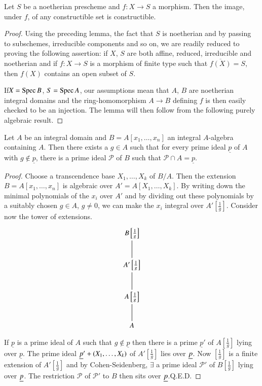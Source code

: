 \begin{lemma}\label{chap3-lem3.3.6}
Let $S$ be a noetherian prescheme and $f:X\to S$ a morphism. Then the
image, under $f$, of any constructible set is constructible.
\end{lemma}

\begin{proof}
Using the preceding lemma, the fact that $S$ is noetherian and by
passing to subschemes, irreducible components and so on, we are
readily reduced to proving the following assertion: if $X$, $S$ are
both affine, reduced, irreducible and noetherian and if $f:X\to S$ is
a morphism of finite type such that $\overline{f(X)}=S$, then $f(X)$
contains an open subset of $S$. 

If\pageoriginale $X=\operatorname{Spec} B$, $S=\operatorname{Spec} A$, our assumptions mean that
$A$, $B$ are noetherian integral domains and the ring-homomorphism
$A\to B$ defining $f$ is then easily checked to be an injection. The
lemma will then follow from the following purely algebraic result. 
\end{proof}

\begin{lemma}\label{chap3-lem3.3.7}
Let $A$ be an integral domain and $B=A[x_{1},\ldots,x_{n}]$ an
integral $A$-algebra containing $A$. Then there exists a $g\in A$ such
that for every prime ideal $\underline{p}$ of $A$ with $g\not\in
\underline{p}$, there is a prime ideal $\mathscr{P}$ of $B$ such that
$\mathscr{P}\cap A=\underline{p}$.
\end{lemma}

\begin{proof}
Choose a transcendence base $X_{1},\ldots,X_{k}$ of $B/A$. Then the
extension $B=A[x_{1},\ldots,x_{n}]$ is algebraic over
$A'=A[X_{1},\ldots,X_{k}]$. By writing down the minimal polynomials of
the $x_{i}$ over $A'$ and by dividing out these polynomials by a
suitably chosen $g\in A$, $g\neq 0$, we can make the $x_{i}$ integral
over $A'\left[\frac{1}{g}\right]$. Consider now the tower of
extensions.
\[
\xymatrix{
B\left[\frac{1}{g}\right]\ar@{-}[d]\\
A'\left[\frac{1}{g}\right]\ar@{-}[d]\\
A\left[\frac{1}{g}\right]\ar@{-}[d]\\
A
}
\]

If $\underline{p}$ is a prime ideal of $A$ such that $g\not\in
\underline{p}$ then there is a prime $\underline{p}'$ of
$A\left[\frac{1}{g}\right]$ lying over $\underline{p}$. The prime
ideal $\underline{p}'+(X_{1},\ldots,X_{k})$ of $A'\left[\frac{1}{g}\right]$
lies over $\underline{p}$. Now $\left[\frac{1}{g}\right]$ is a finite
extension of $A'\left[\frac{1}{g}\right]$
and by Cohen-Seidenberg, $\exists$ a prime ideal $\mathscr{P}'$ of
$B\left[\frac{1}{g}\right]$ lying over $\underline{p}$. The restriction
$\mathscr{P}$ of $\mathscr{P}'$ to $B$ then sits over $\underline{p}$.\hfill Q.E.D.
\end{proof}

